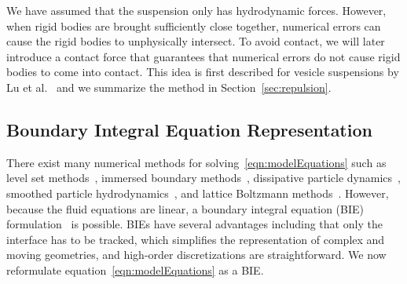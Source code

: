 \documentclass[AMA,STIX1COL]{WileyNJD-v2}
\begin{document}
We have assumed that the suspension only has hydrodynamic forces.
However, when rigid bodies are brought sufficiently close together,
numerical errors can cause the rigid bodies to unphysically intersect.
To avoid contact,  we will later introduce a contact force that
guarantees that numerical errors do not cause rigid bodies to come into
contact.  This idea is first described for vesicle suspensions by Lu et
al.~\cite{Lu2017} and we summarize the method in
Section~\ref{sec:repulsion}.  


\subsection{Boundary Integral Equation Representation}
There exist many numerical methods for
solving~\eqref{eqn:modelEquations} such as level set
methods~\cite{Dou2007}, immersed boundary methods~\cite{Mittal2005},
dissipative particle dynamics~\cite{Pivkin2010}, smoothed particle
hydrodynamics~\cite{Polfer2016}, and lattice Boltzmann
methods~\cite{Ladd1994a, Ladd1994b}. However, because the fluid
equations are linear, a boundary integral equation (BIE)
formulation~\cite{Pozrikidis1992} is possible.  BIEs have several
advantages including that only the interface has to be tracked, which
simplifies the representation of complex and moving geometries, and
high-order discretizations are straightforward.  We now reformulate
equation~\eqref{eqn:modelEquations} as a BIE.
\end{document}
